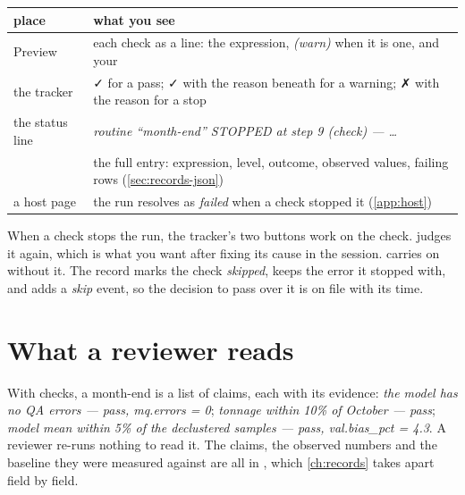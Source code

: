 \begin{tabularx}{\linewidth}{@{}lL@{}}\toprule
place & what you see \\ \midrule
Preview & each check as a line: the expression, \emph{(warn)} when it is one, and your  \\
the tracker & ✓ for a pass; ✓ with the reason beneath for a warning; ✗ with the reason for a stop \\
the status line & \emph{routine “month-end” STOPPED at step 9 (check) — …} \\
 & the full entry: expression, level, outcome, observed values, failing rows (\cref{sec:records-json}) \\
a host page & the run resolves as \emph{failed} when a check stopped it (\cref{app:host}) \\
\bottomrule
\end{tabularx}

When a check stops the run, the tracker's two buttons work on the check.  judges it again, which is what you want after fixing its cause in the session.  carries on without it. The record marks the check \emph{skipped}, keeps the error it stopped with, and adds a \emph{skip} event, so the decision to pass over it is on file with its time.

\section{What a reviewer reads}
With checks, a month-end is a list of claims, each with its evidence: \emph{the model has no QA errors — pass, mq.errors = 0}; \emph{tonnage within 10\% of October — pass}; \emph{model mean within 5\% of the declustered samples — pass, val.bias\_pct = 4.3}. A reviewer re-runs nothing to read it. The claims, the observed numbers and the baseline they were measured against are all in , which \cref{ch:records} takes apart field by field.
